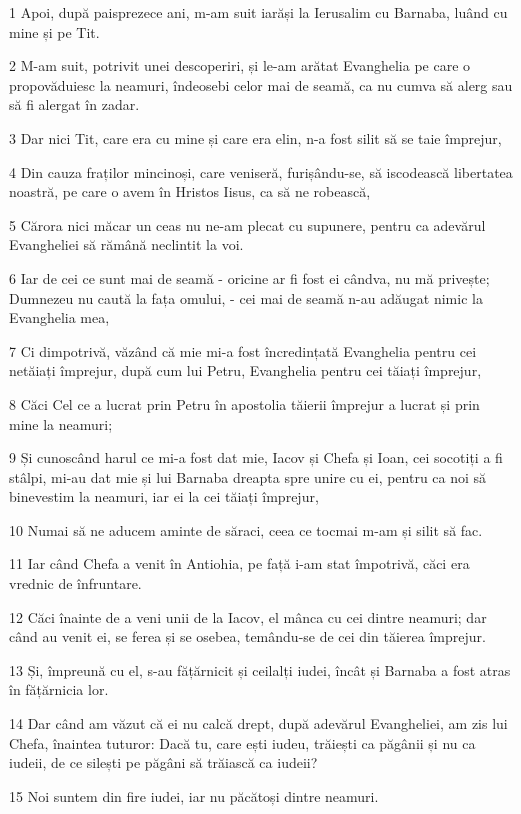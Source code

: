 \par 1 Apoi, după paisprezece ani, m-am suit iarăși la Ierusalim cu Barnaba, luând cu mine și pe Tit.
\par 2 M-am suit, potrivit unei descoperiri, și le-am arătat Evanghelia pe care o propovăduiesc la neamuri, îndeosebi celor mai de seamă, ca nu cumva să alerg sau să fi alergat în zadar.
\par 3 Dar nici Tit, care era cu mine și care era elin, n-a fost silit să se taie împrejur,
\par 4 Din cauza fraților mincinoși, care veniseră, furișându-se, să iscodească libertatea noastră, pe care o avem în Hristos Iisus, ca să ne robească,
\par 5 Cărora nici măcar un ceas nu ne-am plecat cu supunere, pentru ca adevărul Evangheliei să rămână neclintit la voi.
\par 6 Iar de cei ce sunt mai de seamă - oricine ar fi fost ei cândva, nu mă privește; Dumnezeu nu caută la fața omului, - cei mai de seamă n-au adăugat nimic la Evanghelia mea,
\par 7 Ci dimpotrivă, văzând că mie mi-a fost încredințată Evanghelia pentru cei netăiați împrejur, după cum lui Petru, Evanghelia pentru cei tăiați împrejur,
\par 8 Căci Cel ce a lucrat prin Petru în apostolia tăierii împrejur a lucrat și prin mine la neamuri;
\par 9 Și cunoscând harul ce mi-a fost dat mie, Iacov și Chefa și Ioan, cei socotiți a fi stâlpi, mi-au dat mie și lui Barnaba dreapta spre unire cu ei, pentru ca noi să binevestim la neamuri, iar ei la cei tăiați împrejur,
\par 10 Numai să ne aducem aminte de săraci, ceea ce tocmai m-am și silit să fac.
\par 11 Iar când Chefa a venit în Antiohia, pe față i-am stat împotrivă, căci era vrednic de înfruntare.
\par 12 Căci înainte de a veni unii de la Iacov, el mânca cu cei dintre neamuri; dar când au venit ei, se ferea și se osebea, temându-se de cei din tăierea împrejur.
\par 13 Și, împreună cu el, s-au fățărnicit și ceilalți iudei, încât și Barnaba a fost atras în fățărnicia lor.
\par 14 Dar când am văzut că ei nu calcă drept, după adevărul Evangheliei, am zis lui Chefa, înaintea tuturor: Dacă tu, care ești iudeu, trăiești ca păgânii și nu ca iudeii, de ce silești pe păgâni să trăiască ca iudeii?
\par 15 Noi suntem din fire iudei, iar nu păcătoși dintre neamuri.
